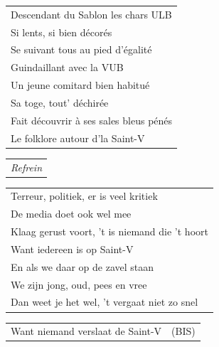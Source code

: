 \documentclass{article}
\begin{document}
\begin{flushleft}
\begin{tabularx}{0.8\textwidth} {
   >{\raggedright\arraybackslash}X}
Descendant du Sablon les chars ULB\\
Si lents, si bien décorés\\
Se suivant tous au pied d’égalité\\
Guindaillant avec la VUB\\
Un jeune comitard bien habitué\\
Sa toge, tout’ déchirée\\
Fait découvrir à ses sales bleus pénés\\
Le folklore autour d’la Saint-V\\
\end{tabularx}
\end{flushleft}\begin{flushleft}
\begin{tabularx}{0.8\textwidth} {
   >{\raggedright\arraybackslash}X}
   \textit{Refrein}
\end{tabularx}
\end{flushleft}\begin{flushleft}
\begin{tabularx}{0.8\textwidth} {
   >{\raggedright\arraybackslash}X}
Terreur, politiek, er is veel kritiek\\
De media doet ook wel mee\\
Klaag gerust voort, ’t is niemand die ’t hoort\\
Want iedereen is op Saint-V\\
En als we daar op de zavel staan\\
We zijn jong, oud, pees en vree\\
Dan weet je het wel, ’t vergaat niet zo snel\\
\end{tabularx}
\begin{tabularx}{0.8\textwidth} {
   >{\raggedright\arraybackslash}X c}
Want niemand verslaat de Saint-V & (BIS)\\
\end{tabularx}
\end{flushleft}
\end{document}
